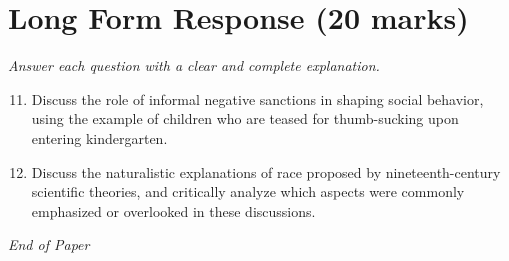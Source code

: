 \documentclass[12pt]{article}
\begin{document}
\section*{Long Form Response (20 marks)}
\textit{Answer each question with a clear and complete explanation.}
\begin{enumerate}[label=\arabic*.]
\setcounter{enumi}{10}
\item Discuss the role of informal negative sanctions in shaping social behavior, using the example of children who are teased for thumb-sucking upon entering kindergarten.
\item Discuss the naturalistic explanations of race proposed by nineteenth-century scientific theories, and critically analyze which aspects were commonly emphasized or overlooked in these discussions.
\end{enumerate}

\vfill
\noindent\textit{End of Paper}
\end{document}
